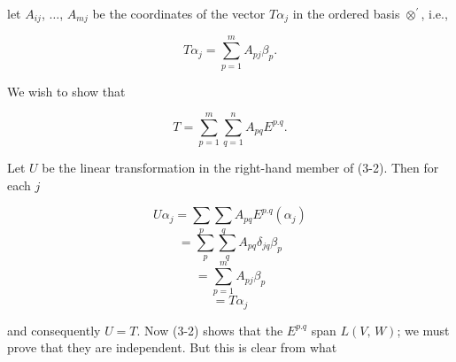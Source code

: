 let \(A_{ij}\), \(\ldots\), \(A_{mj}\) be the coordinates of the vector \(T\alpha_{j}\) in the ordered basis \(\otimes^{\prime}\), i.e.,

\[T\alpha_{j}=\sum_{p=1}^{m}A_{pj}\beta_{p}.\]

We wish to show that

\[T=\sum_{p=1}^{m}\sum_{q=1}^{n}A_{pq}E^{p.q}.\]

Let \(U\) be the linear transformation in the right-hand member of (3-2). Then for each \(j\)

\[U\alpha_{j} =\sum_{p}\sum_{q}A_{pq}E^{p.q}(\alpha_{j})\] \[=\sum_{p}\sum_{q}A_{pq}\delta_{jq}\beta_{p}\] \[=\sum_{p=1}^{m}A_{pj}\beta_{p}\] \[=T\alpha_{j}\]

and consequently \(U=T\). Now (3-2) shows that the \(E^{p.q}\) span \(L(V,\,W)\); we must prove that they are independent. But this is clear from what 